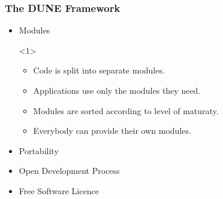 \documentclass[ignorenonframetext,11pt]{beamer}
\theoremstyle{definition}
\begin{document}
\begin{frame} \frametitle{The DUNE Framework}
  \label{dunedevelopment}
  \hspace*{-.7cm}
    \begin{minipage}[t]{0.54\textwidth}
        \begin{itemize}
        \item Modules
          \begin{onlyenv}<1>
            \begin{itemize}
            \item Code is split into separate modules.
            \item Applications use only the modules they need.
            \item Modules are sorted according to level of maturaty.
            \item Everybody can provide their own modules.
            \end{itemize}
          \end{onlyenv}
        \item Portability
        \item Open Development Process
        \item Free Software Licence

\end{itemize}
\end{minipage}
\end{frame}
\end{document}

